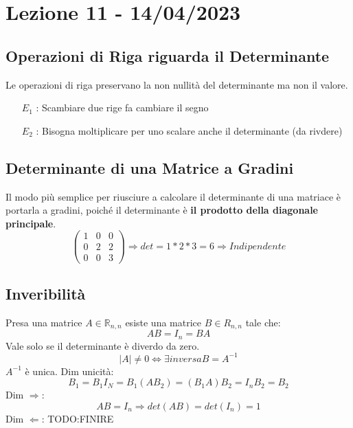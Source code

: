 \section{Lezione 11 - 14/04/2023}

\subsection{Operazioni di Riga riguarda il Determinante}
Le operazioni di riga preservano la non nullità del determinante ma non il valore.
\begin{itemize}
\item[$E_1$]: Scambiare due rige fa cambiare il segno
\item[$E_2$]: Bisogna moltiplicare per uno scalare anche il determinante (da rivdere)
\end{itemize}

\subsection{Determinante di una Matrice a Gradini}
Il modo più semplice per riusciure a calcolare il determinante di una matriace è portarla a gradini, poiché il determinante è \textbf{il prodotto della diagonale principale}.\\
$$ 
\begin{pmatrix}
1 & 0 & 0 \\
0 & 2 & 2 \\
0 & 0 & 3
\end{pmatrix} 
\Rightarrow det = 1*2*3 = 6 \Rightarrow Indipendente
$$

\subsection{Inveribilità}
Presa una matrice $A \in \mathbb{R}_{n,n}$ esiste una matrice $B \in R_{n,n}$ tale che:
$$ AB = I_n = BA $$
Vale solo se il determinante è diverdo da zero.
$$ |A| \neq 0 \Leftrightarrow \exists inversa B=A^{-1} $$
$A^{-1}$ è unica.
Dim unicità:
$$ B_1=B_1I_N=B_1(AB_2)=(B_1A)B_2=I_nB_2=B_2 $$
Dim $\Rightarrow$:
$$ AB = I_n \Rightarrow det(AB) = det(I_n) = 1 $$
Dim $\Leftarrow$:
TODO:FINIRE

